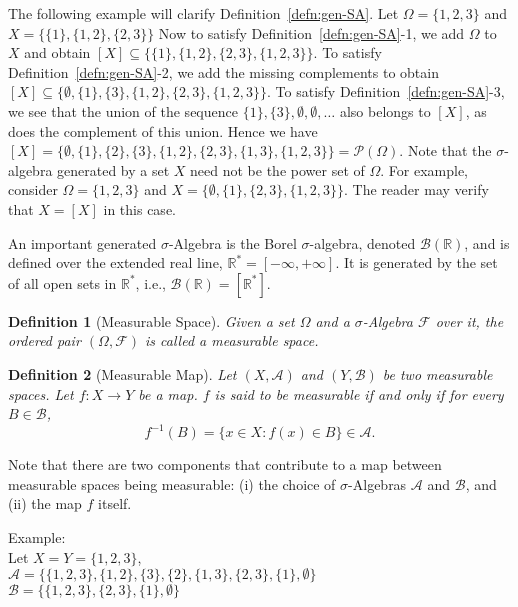 \documentclass[10pt, oneside]{article}
\newcommand{\R}{\mathbb{R}}
\newtheorem{defn}{Definition}
\begin{document}
The following example will clarify Definition~\ref{defn:gen-SA}.
Let $\Omega = \{1,2,3\}$ and $X=\{\{1\},\{1,2\},\{2,3\}\}$
Now to satisfy Definition~\ref{defn:gen-SA}-1, we add $\Omega$ to $X$ and obtain $[X]\subseteq\{\{1\},\{1,2\},\{2,3\},\{1,2,3\}\}$.
To satisfy Definition~\ref{defn:gen-SA}-2, we add the missing complements to obtain $[X]\subseteq\{\emptyset, \{1\},\{3\},\{1,2\},\{2,3\},\{1,2,3\}\}$.
To satisfy Definition~\ref{defn:gen-SA}-3, we see that the union of the sequence $\{1\},\{3\},\emptyset,\emptyset,\ldots$ also belongs to $[X]$, as does the complement of this union. Hence we have $[X]= \{\emptyset, \{1\},\{2\},\{3\},\{1,2\},\{2,3\},\{1,3\},\{1,2,3\}\}=\mathcal{P}(\Omega)$.
Note that the $\sigma$-algebra generated by a set $X$ need not be the power set of $\Omega$.
For example, consider $\Omega=\{1,2,3\}$ and $X=\{\emptyset,\{1\},\{2,3\},\{1,2,3\}\}$.
The reader may verify that $X=[X]$ in this case.

An important generated $\sigma$-Algebra is the Borel $\sigma$-algebra, denoted 
$\mathcal{B}(\R)$, and is defined over the extended real line, $\R^{*} = [-\infty,
+\infty]$. It is generated by the set of all open sets in $\R^{*}$, i.e., 
$\mathcal{B}(\R) = [\R^{*}]$. 

\begin{defn}[Measurable Space]
    \label{defn:space}
    Given a set $\Omega$ and a $\sigma$-Algebra $\mathcal{F}$ over it, the ordered 
    pair $(\Omega,\mathcal{F})$ is called a measurable space. 
\end{defn}

\begin{defn}[Measurable Map]
    \label{defn:map}
    Let $(X,\mathcal{A})$ and $(Y,\mathcal{B})$ be two measurable spaces. Let 
    $f \colon X \to Y$ be a map. $f$ is said to be measurable if and only if 
    for every $B \in \mathcal{B}$, 
    \[f^{-1}(B) = \{x \in X \colon f(x) \in B\} \in \mathcal{A}.\]
\end{defn}

Note that there are two components that contribute to a map between measurable spaces
being measurable: (i) the choice of $\sigma$-Algebras $\mathcal{A}$ and $\mathcal{B}$,
and (ii) the map $f$ itself. 

Example:\\ Let $X=Y=\{1,2,3\}$, \\$\mathcal{A}=\{\{1,2,3\},\{1,2\},\{3\},\{2\},\{1,3\},\{2,3\},\{1\},\emptyset\}$ \\ $\mathcal{B}=\{\{1,2,3\},\{2,3\},\{1\},\emptyset\}$ \\
\end{document}

